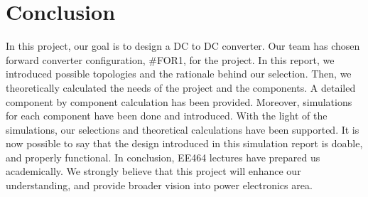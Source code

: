 \section{Conclusion}
In this project, our goal is to design a DC to DC converter. Our team has chosen forward converter configuration, \#FOR1, for the project. In this report, we introduced possible topologies and the rationale behind our selection. Then, we theoretically calculated the needs of the project and the components. A detailed component by component calculation has been provided. Moreover, simulations for each component have been done and introduced. With the light of the simulations, our selections and theoretical calculations have been supported. It is now possible to say that the design introduced in this simulation report is doable, and properly functional. In conclusion, EE464 lectures have prepared us academically. We strongly  believe that this project will enhance our understanding, and provide broader vision into power electronics area.